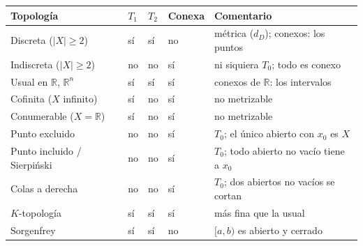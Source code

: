 \documentclass[11pt,a4paper]{article}
\theoremstyle{definition}
\theoremstyle{plain}
\newcommand{\R}{\mathbb{R}}
\begin{document}
\begin{center}
\begin{tabular}{@{}p{4.6cm}p{1.2cm}p{1.2cm}p{1.9cm}p{5.2cm}@{}}
\hline
\textbf{Topología} & \textbf{$T_1$} & \textbf{$T_2$} & \textbf{Conexa} & \textbf{Comentario}\\
\hline
Discreta ($|X|\ge2$) & sí & sí & no & métrica ($d_D$); conexos: los puntos\\
Indiscreta ($|X|\ge2$) & no & no & sí & ni siquiera $T_0$; todo es conexo\\
Usual en $\R$, $\R^n$ & sí & sí & sí & conexos de $\R$: los intervalos\\
Cofinita ($X$ infinito) & sí & no & sí & no metrizable\\
Conumerable ($X=\R$) & sí & no & sí & no metrizable\\
Punto excluido & no & no & sí & $T_0$; el único abierto con $x_0$ es $X$\\
Punto incluido / Sierpi\'nski & no & no & sí & $T_0$; todo abierto no vacío tiene a $x_0$\\
Colas a derecha & no & no & sí & $T_0$; dos abiertos no vacíos se cortan\\
$K$-topología & sí & sí & sí & más fina que la usual\\
Sorgenfrey & sí & sí & no & $[a,b)$ es abierto y cerrado\\
\hline
\end{tabular}
\end{center}
\end{document}

